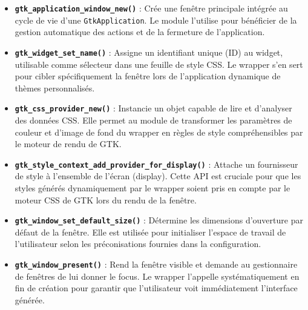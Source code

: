 \begin{itemize}
    \item \textbf{\texttt{gtk\_application\_window\_new()}} : Crée une fenêtre principale intégrée au cycle de vie d'une \texttt{GtkApplication}. Le module l'utilise pour bénéficier de la gestion automatique des actions et de la fermeture de l'application.
    \item \textbf{\texttt{gtk\_widget\_set\_name()}} : Assigne un identifiant unique (ID) au widget, utilisable comme sélecteur dans une feuille de style CSS. Le wrapper s'en sert pour cibler spécifiquement la fenêtre lors de l'application dynamique de thèmes personnalisés.
    \item \textbf{\texttt{gtk\_css\_provider\_new()}} : Instancie un objet capable de lire et d'analyser des données CSS. Elle permet au module de transformer les paramètres de couleur et d'image de fond du wrapper en règles de style compréhensibles par le moteur de rendu de GTK.
    \item \textbf{\texttt{gtk\_style\_context\_add\_provider\_for\_display()}} : Attache un fournisseur de style à l'ensemble de l'écran (display). Cette API est cruciale pour que les styles générés dynamiquement par le wrapper soient pris en compte par le moteur CSS de GTK lors du rendu de la fenêtre.
    \item \textbf{\texttt{gtk\_window\_set\_default\_size()}} : Détermine les dimensions d'ouverture par défaut de la fenêtre. Elle est utilisée pour initialiser l'espace de travail de l'utilisateur selon les préconisations fournies dans la configuration.
    \item \textbf{\texttt{gtk\_window\_present()}} : Rend la fenêtre visible et demande au gestionnaire de fenêtres de lui donner le focus. Le wrapper l'appelle systématiquement en fin de création pour garantir que l'utilisateur voit immédiatement l'interface générée.
\end{itemize}

\newpage

